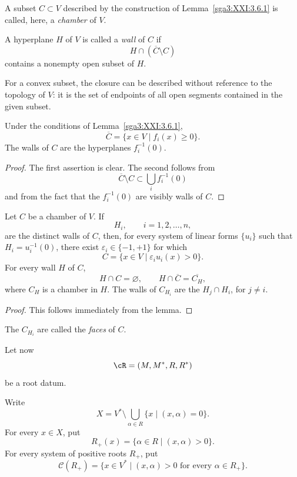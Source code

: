 \begin{definition}\label{sga3:XXI:3.6.2}
A subset \(C\subset V\) described by the construction of
Lemma~\ref{sga3:XXI:3.6.1} is called, here, a \emph{chamber} of \(V\).
\end{definition}

\begin{definition}\label{sga3:XXI:3.6.3}
A hyperplane \(H\) of \(V\) is called a \emph{wall} of \(C\) if
\[
 H\cap(\overline C\setminus C)
\]
contains a nonempty open subset of \(H\).
\end{definition}

\begin{remark}\label{sga3:XXI:3.6.4}
For a convex subset, the closure can be described without reference
to the topology of \(V\): it is the set of endpoints of all open
segments contained in the given subset.
\end{remark}

\begin{lemma}\label{sga3:XXI:3.6.5}
Under the conditions of Lemma~\ref{sga3:XXI:3.6.1},
\[
 \overline C=\{x\in V\mid f_i(x)\ge0\}.
\]
The walls of \(C\) are the hyperplanes \(f_i^{-1}(0)\).
\end{lemma}

\begin{proof}
The first assertion is clear. The second follows from
\[
 \overline C\setminus C\subset\bigcup_i f_i^{-1}(0)
\]
and from the fact that the \(f_i^{-1}(0)\) are visibly walls of
\(C\).
\end{proof}

\begin{proposition}\label{sga3:XXI:3.6.6}
Let \(C\) be a chamber of \(V\). If
\[
 H_i,\qquad i=1,2,\ldots,n,
\]
are the distinct walls of \(C\), then, for every system of linear
forms \(\{u_i\}\) such that \(H_i=u_i^{-1}(0)\), there exist
\(\varepsilon_i\in\{-1,+1\}\) for which
\[
 C=\{x\in V\mid\varepsilon_i u_i(x)>0\}.
\]
For every wall \(H\) of \(C\),
\[
 H\cap C=\varnothing,
 \qquad
 H\cap\overline C=\overline{C_H},
\]
where \(C_H\) is a chamber in \(H\). The walls of \(C_{H_i}\) are
the \(H_j\cap H_i\), for \(j\ne i\).
\end{proposition}

\begin{proof}
This follows immediately from the lemma.
\end{proof}

\begin{definition}\label{sga3:XXI:3.6.7}
The \(C_{H_i}\) are called the \emph{faces} of \(C\).
\end{definition}

Let now
\[
 \cR=(M,M^\ast,R,R^\ast)
\]
be a root datum.

\begin{definition}\label{sga3:XXI:3.6.8}
Write
\[
 X=V^\ast\setminus\bigcup_{\alpha\in R}\{x\mid(x,\alpha)=0\}.
\]
For every \(x\in X\), put
\[
 R_+(x)=\{\alpha\in R\mid(x,\alpha)>0\}.
\]
For every system of positive roots \(R_+\), put
\[
 \mathcal{C}(R_+)
   =\{x\in V^\ast
       \mid (x,\alpha)>0\text{ for every }\alpha\in R_+\}.
\]
\end{definition}
